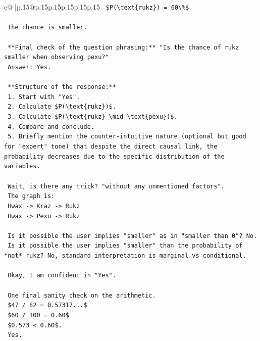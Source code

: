 \documentclass{article}
\begin{document}
{\begin{supertabular}{c@{$\;$}|p{.15\linewidth}@{}p{.15\linewidth}p{.15\linewidth}p{.15\linewidth}p{.15\linewidth}p{.15\linewidth}}
{{{\texttt{    \$P(\textbackslash{}text\{rukz\}) = 60\textbackslash{}\%\$} \\
\\ 
\texttt{    The chance is smaller.} \\
\\ 
\texttt{    **Final check of the question phrasing:** "Is the chance of rukz smaller when observing pexu?"} \\
\texttt{    Answer: Yes.} \\
\\ 
\texttt{    **Structure of the response:**} \\
\texttt{    1. Start with "Yes".} \\
\texttt{    2. Calculate \$P(\textbackslash{}text\{rukz\})\$.} \\
\texttt{    3. Calculate \$P(\textbackslash{}text\{rukz\} \textbackslash{}mid \textbackslash{}text\{pexu\})\$.} \\
\texttt{    4. Compare and conclude.} \\
\texttt{    5. Briefly mention the counter{-}intuitive nature (optional but good for "expert" tone) that despite the direct causal link, the probability decreases due to the specific distribution of the variables.} \\
\\ 
\texttt{    Wait, is there any trick? "without any unmentioned factors".} \\
\texttt{    The graph is:} \\
\texttt{    Hwax {-}> Kraz {-}> Rukz} \\
\texttt{    Hwax {-}> Pexu {-}> Rukz} \\
\\ 
\texttt{    Is it possible the user implies "smaller" as in "smaller than 0"? No.} \\
\texttt{    Is it possible the user implies "smaller" than the probability of *not* rukz? No, standard interpretation is marginal vs conditional.} \\
\\ 
\texttt{    Okay, I am confident in "Yes".} \\
\\ 
\texttt{    One final sanity check on the arithmetic.} \\
\texttt{    \$47 / 82 = 0.57317...\$} \\
\texttt{    \$60 / 100 = 0.60\$} \\
\texttt{    \$0.573 < 0.60\$.} \\
\texttt{    Yes.} \\
}}}
\end{supertabular}}
\end{document}
